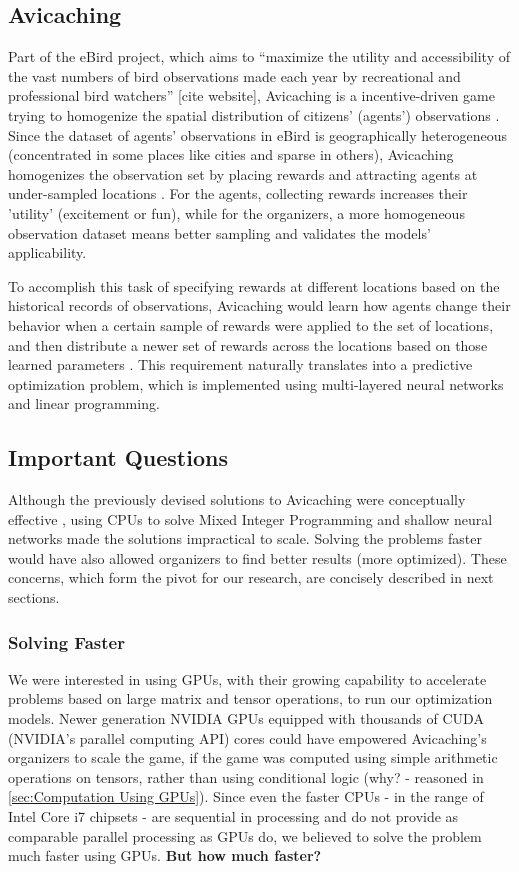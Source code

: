 \documentclass[12pt]{article}
\begin{document}
    \subsection{Avicaching}
    Part of the eBird project, which aims to ``maximize the utility and accessibility of the vast numbers of bird observations made each year by recreational and professional bird watchers'' [cite website], Avicaching is a incentive-driven game trying to homogenize the spatial distribution of citizens' (agents') observations \cite{Xue2016Avi1}. Since the dataset of agents' observations in eBird is geographically heterogeneous (concentrated in some places like cities and sparse in others), Avicaching homogenizes the observation set by placing rewards and attracting agents at under-sampled locations \cite{Xue2016Avi1}. For the agents, collecting rewards increases their 'utility' (excitement or fun), while for the organizers, a more homogeneous observation dataset means better sampling and validates the models' applicability. 
    
    To accomplish this task of specifying rewards at different locations based on the historical records of observations, Avicaching would learn how agents change their behavior when a certain sample of rewards were applied to the set of locations, and then distribute a newer set of rewards across the locations based on those learned parameters \cite{Xue2016Avi2}. This requirement naturally translates into a predictive optimization problem, which is implemented using multi-layered neural networks and linear programming.
    
    \subsection{Important Questions}
    Although the previously devised solutions to Avicaching were conceptually effective \cite{Xue2016Avi1}\cite{Xue2016Avi2}, using CPUs to solve Mixed Integer Programming and shallow neural networks made the solutions impractical to scale. Solving the problems faster would have also allowed organizers to find better results (more optimized). These concerns, which form the pivot for our research, are concisely described in next sections.
    
    \subsubsection{Solving Faster} \label{sec:Important Questions - Solving Faster}
    We were interested in using GPUs, with their growing capability to accelerate problems based on large matrix and tensor operations, to run our optimization models. Newer generation NVIDIA GPUs equipped with thousands of CUDA (NVIDIA's parallel computing API) cores \cite{NVIDIA} could have empowered Avicaching's organizers to scale the game, if the game was computed using simple arithmetic operations on tensors, rather than using conditional logic (why? - reasoned in \cref{sec:Computation Using GPUs}). Since even the faster CPUs - in the range of Intel Core i7 chipsets - are sequential in processing and do not provide as comparable parallel processing as GPUs do, we believed to solve the problem much faster using GPUs. \textbf{But how much faster?}
    
\end{document}
